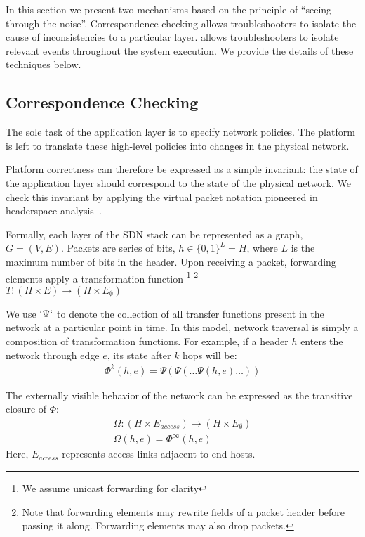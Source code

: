 In this section we present two mechanisms based on the principle of ``seeing
through the noise''. Correspondence checking allows troubleshooters to isolate
the cause of inconsistencies to a particular layer. \Simulator
allows troubleshooters to isolate relevant events throughout the system
execution. We provide the details of these techniques below. 

\subsection{Correspondence Checking}

The sole task of the application layer is to specify network
policies. The platform is left to translate these high-level policies
into changes in the physical network.

Platform correctness can therefore be expressed as a simple invariant:
the state of the application layer should correspond to the state of the
physical network. We check this invariant by applying the virtual packet notation pioneered
in headerspace analysis~\cite{hsa}. 

Formally, each layer of the SDN stack can be represented as a graph,
$G = (V, E)$. Packets are series of bits, $h \in \{0,1\}^L = H$,
where $L$ is the maximum number of bits in the header. Upon receiving a packet,
forwarding elements apply a transformation function \footnote{We assume unicast forwarding for clarity}
\footnote{Note that forwarding elements may rewrite fields of a packet header
before passing it along. Forwarding elements may also drop packets.} \\
$T: (H \times E) \rightarrow (H \times E_{\emptyset})$

We use $`\Psi`$ to denote the collection of all transfer functions present in
the network at a particular point in time. In this model, network traversal is simply a composition of transformation
functions. For example, if a header $h$ enters the network through edge
$e$, its state after $k$ hops will be:
\begin{align*}
\Phi^k(h,e) = \Psi(\Psi(\dots \Psi(h,e)\dots))
\end{align*}

The externally visible behavior of the network can be expressed as the
transitive closure of $\Phi$:
\begin{align*}
\Omega: (H \times E_{access}) \rightarrow (H \times E_{\emptyset}) \\
\Omega(h,e) = \Phi^{\infty}(h,e)
\end{align*}
Here, $E_{access}$ represents access links adjacent to end-hosts.


